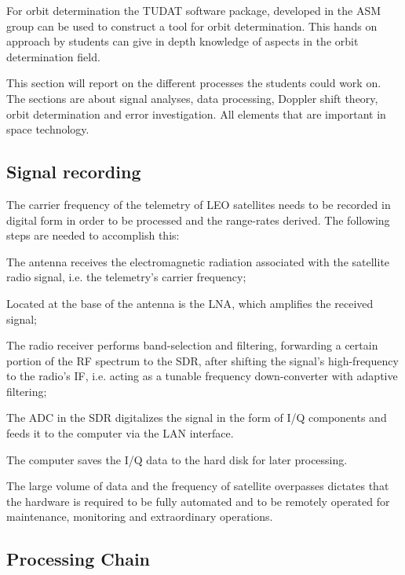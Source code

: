 \documentclass[11pt,a4paper,oneside]{article}
\newcommand{\listskip}{0pt}
\newenvironment{itemize*}
{\begin{itemize}
  \setlength{\itemsep}{\listskip}
  \setlength{\parskip}{\listskip}
  \setlength{\parsep}{\listskip}}
{\end{itemize}}
\begin{document}
For orbit determination the \ac{TUDAT} software package, developed in the \ac{ASM} group can be used to construct a tool for orbit determination. This hands on approach by students can give in depth knowledge of aspects in the orbit determination field.

This section will report on the different processes the students could work on. The sections are about signal analyses, data processing, Doppler shift theory, orbit determination and error investigation. All elements that are important in space technology.



\subsection{Signal recording}

The carrier frequency of the telemetry of \ac{LEO} satellites needs to be recorded in digital form in order to be processed and the range-rates derived. The following steps are needed to accomplish this:

\begin{itemize*}
\item The antenna receives the electromagnetic radiation associated with the satellite radio signal, i.e. the telemetry's carrier frequency;
\item Located at the base of the antenna is the \ac{LNA}, which amplifies the received signal;
\item The radio receiver performs band-selection and filtering, forwarding a certain portion of the \ac{RF} spectrum to the \ac{SDR}, after shifting the signal's high-frequency to the radio's \ac{IF}, i.e. acting as a tunable frequency down-converter with adaptive filtering;
\item The \ac{ADC} in the \ac{SDR} digitalizes the signal in the form of \ac{I/Q} components and feeds it to the computer via the \ac{LAN} interface.
\item The computer saves the \ac{I/Q} data to the hard disk for later processing.
\end{itemize*}

The large volume of data and the frequency of satellite overpasses dictates that the hardware is required to be fully automated and to be remotely operated for maintenance, monitoring and extraordinary operations.



\subsection{Processing Chain}
\end{document}
